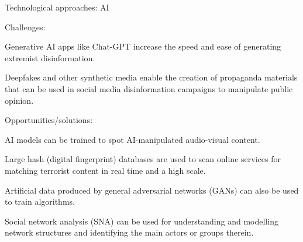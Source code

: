 \documentclass[nobackground,dvipsnames,table]{beamer}
\begin{document}
\begin{frame}{Technological approaches: AI}
\footnotesize{
Challenges:
\begin{itemize}
    \footnotesize{
    \item Generative AI apps like Chat-GPT increase the speed and ease of generating extremist disinformation. 
    \item Deepfakes and other synthetic media enable the creation of propaganda materials that can be used in social media disinformation campaigns to manipulate public opinion.
    }
\end{itemize}

Opportunities/solutions:
\begin{itemize}
    \footnotesize{
    \item AI models can be trained to spot AI-manipulated audio-visual content.
    \item Large hash (digital fingerprint) databases are used to scan online services for matching terrorist content in real time and a high scale.
    \item Artificial data produced by general adversarial networks (GANs) can also be used to train algorithms.
    \item Social network analysis (SNA) can be used for understanding and modelling network structures and identifying the main actors or groups therein.
    }
\end{itemize}
}


\end{frame}
\end{document}
